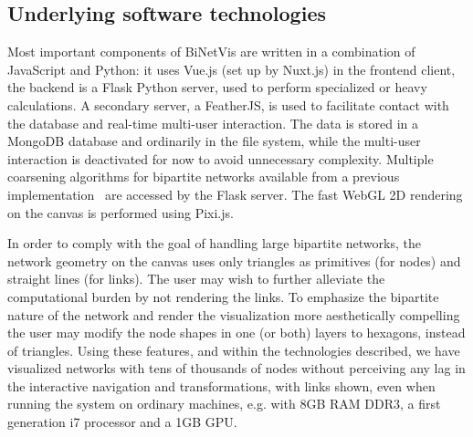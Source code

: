 \documentclass[runningheads]{llncs}
\begin{document}
\subsection{Underlying software technologies}
Most important components of BiNetVis are written in a combination of JavaScript and Python: it uses Vue.js (set up by Nuxt.js) in the frontend client, the backend is a Flask Python server, used to perform specialized or heavy calculations.
A secondary server, a FeatherJS, is used to facilitate contact with the database and real-time multi-user interaction.
The data is stored in a MongoDB database and ordinarily in the file system,
while the multi-user interaction is deactivated for now to avoid unnecessary complexity.
Multiple coarsening algorithms for bipartite networks available from a previous implementation~\cite{alan2} are accessed by the Flask server.
The fast WebGL 2D rendering on the canvas is performed using Pixi.js.

In order to comply with the goal of handling large bipartite networks, the network geometry on the canvas uses only triangles as primitives (for nodes) and straight lines (for links).
The user may wish to further alleviate the computational burden by not rendering the links.
To emphasize the bipartite nature of the network and render the visualization more aesthetically compelling the user may modify the node shapes in one (or both) layers to hexagons, instead of triangles.
Using these features, and within the technologies described, we have visualized networks
with tens of thousands of nodes without perceiving any lag in the interactive navigation and transformations,
with links shown,
even when running the system on ordinary machines, e.g. with 8GB RAM DDR3, a first generation i7 processor and a 1GB GPU.


\end{document}
